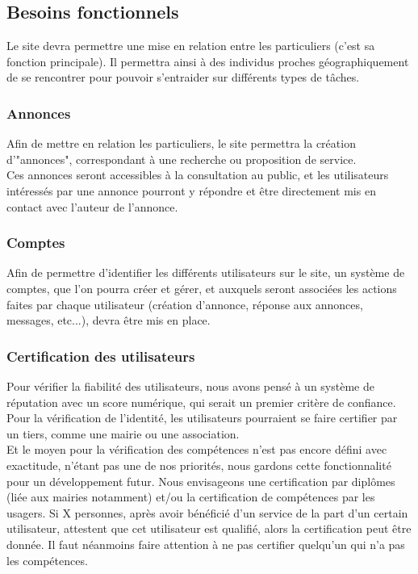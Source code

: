 \documentclass[a4paper,11pt]{article}
\begin{document}

\subsection{Besoins fonctionnels}

Le site devra permettre une mise en relation entre les particuliers (c’est sa fonction principale). Il
permettra ainsi à des individus proches géographiquement de se rencontrer pour pouvoir s’entraider
sur différents types de tâches.\\

\subsubsection{Annonces}

Afin de mettre en relation les particuliers, le site permettra la création d'"annonces", correspondant à une recherche ou proposition de service.\\

Ces annonces seront accessibles à la consultation au public, et les utilisateurs intéressés par une annonce pourront y répondre et être directement mis en contact avec l'auteur de l'annonce.

\subsubsection{Comptes }

Afin de permettre d'identifier les différents utilisateurs sur le site, un système de comptes, que l'on pourra créer et gérer, et auxquels seront associées les actions faites par chaque utilisateur (création d'annonce, réponse aux annonces, messages, etc...), devra être mis en place.

\subsubsection{Certification des utilisateurs}

Pour vérifier la fiabilité des utilisateurs, nous avons pensé à un système de réputation avec un score numérique, qui serait un premier critère de confiance.\\

Pour la vérification de l'identité, les utilisateurs pourraient se faire certifier par un tiers, comme une mairie ou une association.\\

Et le moyen pour la vérification des compétences n'est pas encore défini avec exactitude, n'étant pas une de nos priorités, nous gardons cette fonctionnalité pour un développement futur. Nous envisageons une certification par diplômes (liée aux mairies notamment) et/ou la certification de compétences par les usagers.
Si X personnes, après avoir bénéficié d'un service de la part d'un certain utilisateur, attestent que cet utilisateur est qualifié, alors la certification peut être donnée.
Il faut néanmoins faire attention à ne pas certifier quelqu'un qui n'a pas les compétences.\\
\end{document}
